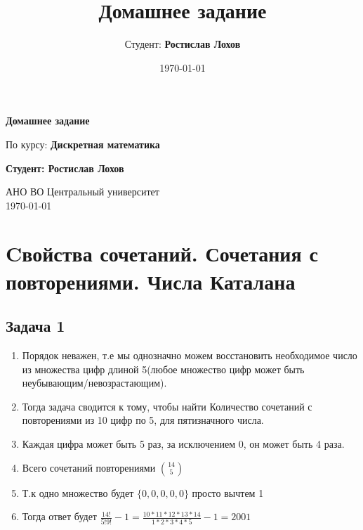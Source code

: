 \documentclass[a4paper,12pt]{article}
\title{Домашнее задание}
\author{Студент: \textbf{Ростислав Лохов}}
\date{\today}
\begin{document}
\begin{titlepage}
    \centering
    \vspace*{1cm}

    \Huge
    \textbf{Домашнее задание}

    \vspace{0.5cm}
    \LARGE
    По курсу: \textbf{Дискретная математика}

    \vspace{1.5cm}

    \textbf{Студент: Ростислав Лохов}

    \vfill

    \Large
    АНО ВО Центральный университет\\
    \vspace{0.3cm}
    \today

\end{titlepage}

\tableofcontents
\newpage

\section{Cвойства сочетаний. Сочетания с повторениями. Числа Каталана}


\subsection{Задача 1}
\begin{enumerate}
    \item Порядок неважен, т.е мы однозначно можем восстановить необходимое число из множества цифр длиной 5(любое множество цифр может быть неубывающим/невозрастающим).
    \item Тогда задача сводится к тому, чтобы найти Количество сочетаний с повторениями из 10 цифр по 5, для пятизначного числа.
    \item Каждая цифра может быть 5 раз, за исключением 0, он может быть 4 раза.
    \item Всего сочетаний повторениями $\binom{14}{5}$
    \item Т.к одно множество будет $\{0, 0, 0, 0, 0\}$ просто вычтем 1
    \item Тогда ответ будет $\frac{14!}{5!9!}-1=\frac{10*11*12*13*14}{1*2*3*4*5}-1=2001$
\end{enumerate}
\end{document}
